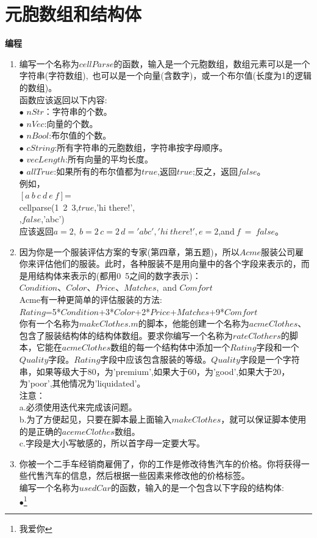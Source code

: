 \documentclass[UTF8]{ctexart}
\begin{document}
\section{元胞数组和结构体}
\textbf{编程}
\begin{enumerate}
	\item 编写一个名称为$cellParse$的函数，输入是一个元胞数组，数组元素可以是一个字符串(字符数组),\ 也可以是一个向量(含数字)，或一个布尔值(长度为1的逻辑的数组)。\\
	函数应该返回以下内容:\\
	$\bullet$ $nStr$：字符串的个数。\\
	$\bullet$ $nVec$:向量的个数。\\
	$\bullet$ $nBool$:布尔值的个数。\\
	$\bullet$ $cString$:所有字符串的元胞数组，字符串按字母顺序。\\
	$\bullet$ $vecLength$:所有向量的平均长度。\\
	$\bullet$ $allTrue$:如果所有的布尔值都为$true$,返回$true$;反之，返回$false$。
	\\例如，\\
	$[a\ b\ c\ d\ e\ f]$=\\
	cellparse({1\ 2\ 3},$true$,'hi there!',\\
	\qquad {},$false$,'abc')\\
	应该返回$a=2,\ b=2\,c=2\,d={'abc','hi\ there!'},e=2$,and$\ f\ =\ false$。
	\item 因为你是一个服装评估方案的专家(第四章，第五题)，所以$Acme$服装公司雇你来评估他们的服装。此时，各种服装不是用向量中的各个字段来表示的，而是用结构体来表示的(都用0~5之间的数字表示)：\\
	$Condition$、$Color$、$Price$、$Matches$,\ and $Comfort$\\
	Acme有一种更简单的评估服装的方法:\\
	\text{\quad\,\,\,} $Rating$=5*$Condition$+3*$Color$+2*$Price$+$Matches$+9*$Comfort$\\
	\text{\quad}你有一个名称为$makeClothes.m$的脚本，他能创建一个名称为$acmeClothes$、包含了服装结构体的结构体数组。要求你编写一个名称为$rateClothers$的脚本，它能在$acmeClothes$数组的每一个结构体中添加一个$Rating$字段和一个$Quality$字段。$Rating$字段中应该包含服装的等级。$Quality$字段是一个字符串，如果等级大于80，为'premium',如果大于60，为'good',如果大于20，为'poor',其他情况为'liquidated'。\\
	\qquad 注意：\\
	a.必须使用迭代来完成该问题。\\
	b.为了方便起见，只要在脚本最上面输入$makeClothes$，就可以保证脚本使用的是正确的$acemeClothes$数组。\\
	c.字段是大小写敏感的，所以首字母一定要大写。
	\item 你被一个二手车经销商雇佣了，你的工作是修改待售汽车的价格。你将获得一些代售汽车的信息，然后根据一些因素来修改他的价格标签。\\
	\qquad 编写一个名称为$usedCar$的函数，输入的是一个包含以下字段的结构体:\\
	$\bullet$\footnote{我爱你}
\end{enumerate}
\end{document}
